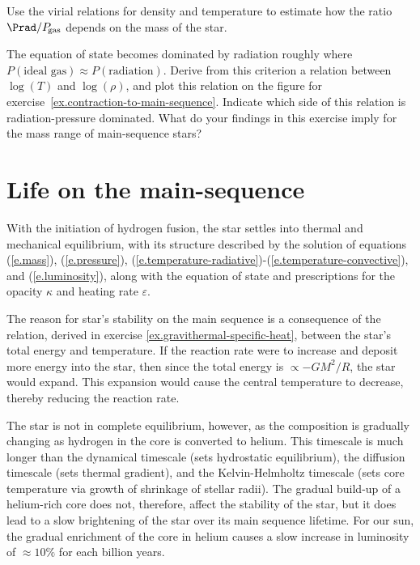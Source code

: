 \begin{exercisebox}
Use the virial relations for density and temperature to estimate how the ratio $\Prad/P_{\!\mathrm{gas}}$ depends on the mass of the star.
\end{exercisebox}

\begin{exercisebox}
\label{ex.maximum-stellar-mass}
The equation of state becomes dominated by radiation roughly where $P(\textrm{ideal gas}) \approx P(\textrm{radiation})$. Derive from this criterion a relation between $\log(T)$ and $\log(\rho)$, and plot this relation on the figure for exercise~\ref{ex.contraction-to-main-sequence}. Indicate which side of this relation is radiation-pressure dominated. What do your findings in this exercise imply for the mass range of main-sequence stars?
\end{exercisebox}

\section{Life on the main-sequence}

With the initiation of hydrogen fusion, the star settles into thermal and mechanical equilibrium, with its structure described by the solution of equations (\ref{e.mass}), (\ref{e.pressure}), (\ref{e.temperature-radiative})-(\ref{e.temperature-convective}), and (\ref{e.luminosity}), along with the equation of state and prescriptions for the opacity $\kappa$ and heating rate $\varepsilon$. 

The reason for star's stability on the main sequence is a consequence of the relation, derived in exercise \ref{ex.gravithermal-specific-heat}, between the star's total energy and temperature. If the reaction rate were to increase and deposit more energy into the star, then since the total energy is $\propto -GM^{2}/R$, the star would expand. This expansion would cause the central temperature to decrease, thereby reducing the reaction rate.

The star is not in complete equilibrium, however, as the composition is gradually changing as hydrogen in the core is converted to helium. This timescale is much longer than the dynamical timescale (sets hydrostatic equilibrium), the diffusion timescale (sets thermal gradient), and the Kelvin-Helmholtz timescale (sets core temperature via growth of shrinkage of stellar radii). The gradual build-up of a helium-rich core does not, therefore, affect the stability of the star, but it does lead to a slow brightening of the star over its main sequence lifetime. For our sun, the gradual enrichment of the core in helium causes a slow increase in luminosity of $\approx10\%$ for each billion years. 

